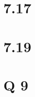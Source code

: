 \documentclass[11pt]{article} %
\begin{document}
\section{7.17}
\section{7.19}
\section{Q 9}
\end{document}
